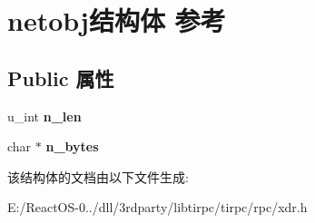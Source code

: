 \hypertarget{structnetobj}{}\section{netobj结构体 参考}
\label{structnetobj}
\subsection*{Public 属性}
\begin{DoxyCompactItemize}
\item 
\mbox{\label{structnetobj_a83ba1060952745625b8dcd4f9950a6bc}} 
u\+\_\+int {\bfseries n\+\_\+len}
\item 
\mbox{\label{structnetobj_aee34b7ed11f6e715a101f8f900be3f5c}} 
char $\ast$ {\bfseries n\+\_\+bytes}
\end{DoxyCompactItemize}


该结构体的文档由以下文件生成\+:\begin{DoxyCompactItemize}
\item 
E\+:/\+React\+O\+S-\/0../dll/3rdparty/libtirpc/tirpc/rpc/xdr.\+h\end{DoxyCompactItemize}
